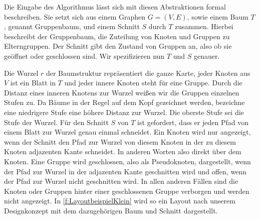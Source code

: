 Die Eingabe des Algorithmus lässt sich mit diesen Abstraktionen formal beschreiben. 
Sie setzt sich aus einem Graphen $G=(V,E)$, sowie einem Baum $T$, genannt Gruppenbaum,  und einem Schnitt $S$ durch $T$ zusammen. 
Hierbei beschreibt der Gruppenbaum, die Zuteilung von Knoten und Gruppen zu Elterngruppen. 
Der Schnitt gibt den Zustand von Gruppen an, also ob sie geöffnet oder geschlossen sind. Wir spezifizieren nun $T$ und $S$ genauer.

Die Wurzel $r$ der Baumstruktur repräsentiert die ganze Karte, jeder Knoten aus $V$ ist ein Blatt in $T$ und jeder innere Knoten steht für eine Gruppe.
Durch die Distanz eines inneren Knotens zur Wurzel weißen wir die Gruppen einzelnen Stufen zu. 
Da Bäume in der Regel auf dem Kopf gezeichnet werden, bezeichne eine niedrigere Stufe eine höhere Distanz zur Wurzel. Die oberste Stufe sei die Stufe der Wurzel.
Für den Schnitt $S$ von $T$ ist gefordert, dass er jeden Pfad von einem Blatt zur Wurzel genau einmal schneidet.
Ein Knoten wird nur angezeigt, wenn der Schnitt den Pfad zur Wurzel von diesem Knoten in der zu diesem Knoten adjazenten Kante schneidet. 
In anderen Worten also direkt über dem Knoten.
Eine Gruppe wird geschlossen, also als Pseudoknoten, dargestellt, wenn der Pfad zur Wurzel in der adjazenten Kante geschnitten wird und offen, wenn der Pfad zur Wurzel nicht geschnitten wird. In allen anderen Fällen sind die Knoten oder Gruppen hinter einer geschlossenen Gruppe verborgen und werden nicht angezeigt.
In \autoref{f:LayoutbeispielKlein} wird so ein Layout nach unserem Designkonzept mit dem dazugehörigen Baum und Schnitt dargestellt.

